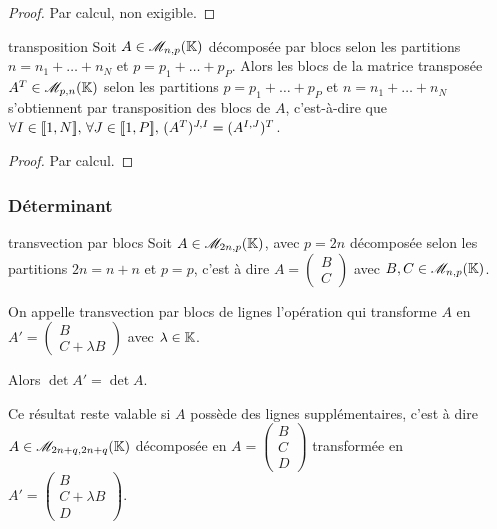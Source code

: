 \begin{proof}
    Par calcul, non exigible.
\end{proof}

\begin{proposition}{transposition}{}
    Soit $A \in \mathscr M_{n, p}(\mathbb{K})$ décomposée par blocs selon les partitions $n = n_1 + \dots + n_N$
    et $p = p_1 + \dots + p_P$. Alors les blocs de la matrice transposée $A^T \in \mathscr M_{p, n}(\mathbb{K})$ selon 
    les partitions $p = p_1 + \dots + p_P$ et $n = n_1 + \dots + n_N$ s'obtiennent 
    par transposition des blocs de $A$, c'est-à-dire que
    $\forall I \in [\![1, N]\!], \, \forall J \in [\![1, P]\!], \, (A^T)^{J, I} = (A^{I, J})^T$.
\end{proposition}

\begin{proof}
    Par calcul.
\end{proof}

\subsubsection{Déterminant}

\begin{proposition}{transvection par blocs}{}
    Soit $A \in \mathscr M_{2n, p}(\mathbb{K})$, avec $p = 2n$
    décomposée selon les partitions $2n = n + n$ et $p = p$, 
    c'est à dire $A = \begin{pmatrix}
        B\\
        C
    \end{pmatrix}$ avec $B, C \in \mathscr M_{n, p}(\mathbb{K})$.

    On appelle transvection par blocs de lignes l'opération qui transforme 
    $A$ en $A' = \begin{pmatrix}
        B  \\
        C + \lambda B
    \end{pmatrix}$ avec $\lambda \in \mathbb{K}$.

    Alors $\det A' = \det A$.
    
\end{proposition}

\begin{remarque}
    Ce résultat reste valable si $A$ possède des lignes supplémentaires, c'est à dire 
    $A \in \mathscr M_{2n + q, 2n + q}(\mathbb{K})$ décomposée en 
    $A = \begin{pmatrix}
        B \\
        C \\
        D
        \end{pmatrix}$ transformée en $A' = \begin{pmatrix}
        B \\
        C + \lambda B \\
        D
    \end{pmatrix}$.
\end{remarque}

